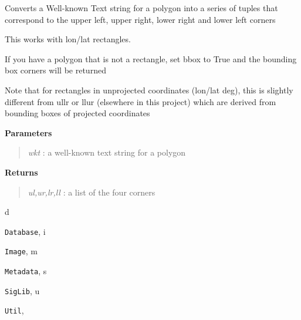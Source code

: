 \documentclass[letterpaper,10pt,openany,oneside]{sphinxmanual}
\begin{document}
\begin{fulllineitems}
\label{code:Util.wktpoly2pts}
Converts a Well-known Text string for a polygon into a series of tuples that
correspond to the upper left, upper right, lower right and lower left corners

This works with lon/lat rectangles.

If you have a polygon that is not a rectangle, set bbox to True and the 
bounding box corners will be returned

Note that for rectangles in unprojected coordinates (lon/lat deg), this is 
slightly different from ullr or llur (elsewhere in this project) which are 
derived from bounding boxes of projected coordinates

\textbf{Parameters}
\begin{quote}

\emph{wkt}         : a well-known text string for a polygon
\end{quote}

\textbf{Returns}
\begin{quote}

\emph{ul,ur,lr,ll} : a list of the four corners
\end{quote}

\end{fulllineitems}



\renewcommand{\indexname}{Python Module Index}
\begin{theindex}
\def\bigletter#1{{\Large\sffamily#1}\nopagebreak\vspace{1mm}}
\bigletter{d}
\item {\texttt{Database}}, \pageref{code:module-Database}
\indexspace
\bigletter{i}
\item {\texttt{Image}}, \pageref{code:module-Image}
\indexspace
\bigletter{m}
\item {\texttt{Metadata}}, \pageref{code:module-Metadata}
\indexspace
\bigletter{s}
\item {\texttt{SigLib}}, \pageref{code:module-SigLib}
\indexspace
\bigletter{u}
\item {\texttt{Util}}, \pageref{code:module-Util}
\end{theindex}

\renewcommand{\indexname}{Index}
\printindex
\end{document}
